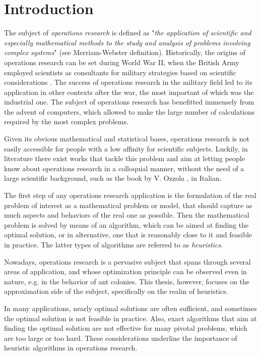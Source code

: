 \documentclass[a4paper,12pt,twoside]{scrbook}
\begin{document}
\chapter{Introduction}
The subject of \textit{operations research} is defined as "\textit{the application of scientific and especially mathematical methods to the study and analysis of problems involving complex systems}" (see Merriam-Webster definition).
Historically, the origins of operations research can be set during World War II, when the British Army employed scientists as consultants for military strategies based on scientific considerations \cite{ozzola2007}. The success of operations research in the military field led to its application in other contexts after the war, the most important of which was the industrial one. The subject of operations research has benefitted immensely from the advent of computers, which allowed to make the large number of calculations required by the most complex problems. \par
Given its obvious mathematical and statistical bases, operations research is not easily accessible for people with a low affinity for scientific subjects. Luckily, in literature there exist works that tackle this problem and aim at letting people know about operations research in a colloquial manner, without the need of a large scientific background, such as the book by V. Ozzola \cite{ozzola2007}, in Italian. \par  
The first step of any operations research application is the formulation of the real problem of interest as a mathematical problem or model, that should capture as much aspects and behaviors of the real one as possible. Then the mathematical problem is solved by means of an algorithm, which can be aimed at finding the optimal solution, or in alternative, one that is reasonably close to it and feasible in practice. The latter types of algorithms are referred to as \textit{heuristics}. \par 
Nowadays, operations research is a pervasive subject that spans through several areas of application, and whose optimization principle can be observed even in nature, e.g. in the behavior of ant colonies.
This thesis, however, focuses on the approximation side of the subject, specifically on the realm of heuristics. \par 
In many applications, nearly optimal solutions are often sufficient, and sometimes the optimal solution is not feasible in practice. Also, exact algorithms that aim at finding the optimal solution are not effective for many pivotal problems, which are too large or too hard. These considerations underline the importance of heuristic algorithms in operations research. \par 
\end{document}
